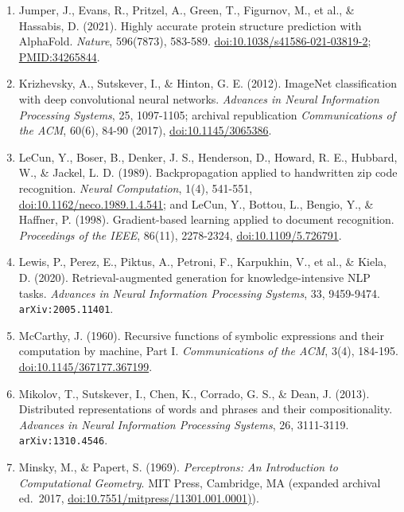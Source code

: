 \documentclass[10pt,letterpaper]{article}
\begin{document}
\begin{enumerate}
  \href{https://doi.org/10.1073/pnas.79.8.2554}{doi:10.1073/pnas.79.8.2554};
  \url{PMID:6953413}.
\item
  Jumper, J., Evans, R., Pritzel, A., Green, T., Figurnov, M., et al.,
  \& Hassabis, D. (2021). Highly accurate protein structure prediction
  with AlphaFold. \emph{Nature}, 596(7873), 583-589.
  \href{https://doi.org/10.1038/s41586-021-03819-2}{doi:10.1038/s41586-021-03819-2};
  \url{PMID:34265844}.
\item
  Krizhevsky, A., Sutskever, I., \& Hinton, G. E. (2012). ImageNet
  classification with deep convolutional neural networks. \emph{Advances
  in Neural Information Processing Systems}, 25, 1097-1105; archival
  republication \emph{Communications of the ACM}, 60(6), 84-90 (2017),
  \href{https://doi.org/10.1145/3065386}{doi:10.1145/3065386}.
\item
  LeCun, Y., Boser, B., Denker, J. S., Henderson, D., Howard, R. E.,
  Hubbard, W., \& Jackel, L. D. (1989). Backpropagation applied to
  handwritten zip code recognition. \emph{Neural Computation}, 1(4),
  541-551,
  \href{https://doi.org/10.1162/neco.1989.1.4.541}{doi:10.1162/neco.1989.1.4.541};
  and LeCun, Y., Bottou, L., Bengio, Y., \& Haffner, P. (1998).
  Gradient-based learning applied to document recognition.
  \emph{Proceedings of the IEEE}, 86(11), 2278-2324,
  \href{https://doi.org/10.1109/5.726791}{doi:10.1109/5.726791}.
\item
  Lewis, P., Perez, E., Piktus, A., Petroni, F., Karpukhin, V., et al.,
  \& Kiela, D. (2020). Retrieval-augmented generation for
  knowledge-intensive NLP tasks. \emph{Advances in Neural Information
  Processing Systems}, 33, 9459-9474. \texttt{arXiv:2005.\allowbreak{}11401}.
\item
  McCarthy, J. (1960). Recursive functions of symbolic expressions and
  their computation by machine, Part I. \emph{Communications of the
  ACM}, 3(4), 184-195.
  \href{https://doi.org/10.1145/367177.367199}{doi:10.1145/367177.367199}.
\item
  Mikolov, T., Sutskever, I., Chen, K., Corrado, G. S., \& Dean, J.
  (2013). Distributed representations of words and phrases and their
  compositionality. \emph{Advances in Neural Information Processing
  Systems}, 26, 3111-3119. \texttt{arXiv:1310.\allowbreak{}4546}.
\item
  Minsky, M., \& Papert, S. (1969). \emph{Perceptrons: An Introduction
  to Computational Geometry}. MIT Press, Cambridge, MA (expanded
  archival ed.~2017,
  \href{https://doi.org/10.7551/mitpress/11301.001.0001}{doi:10.7551/mitpress/11301.001.0001)}).

\end{enumerate}
\end{document}

